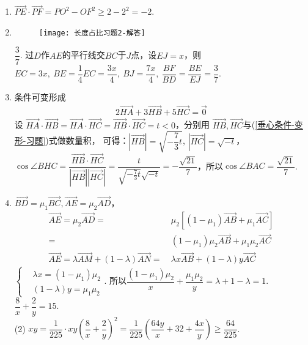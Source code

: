 \begin{enumerate}[label={\textbf{\arabic*.}},leftmargin=
    \inteval{\myenumleftmargin}pt]
\item $ \vec{PE}\cdot \vec{PF}=PO^2-OF^2 \geq 2-2^2=-2 $. 

\item 
\begin{figure}[h]
    \centering
    \texttt{[image: 长度占比习题2-解答]}
\end{figure}
$ \dfrac{3}{7} $. 过$ D $作$ AE $的平行线交$ BC $于$ J $点，设$ EJ=x $，则$ EC=3x,\ BE=\dfrac{1}{4}EC=\dfrac{3x}{4},\ BJ=\dfrac{7x}{4},\ \dfrac{BF}{BD}=\dfrac{BE}{EJ}=\dfrac{3}{7} $. 

\item 条件可变形成
\begin{align}\label{垂心条件-变形-习题}
    2\vec{HA}+
    3\vec{HB} +5\vec{HC}=\vec{0}
\end{align}
设 $ \vec{HA}\cdot \vec{HB}=\vec{HA}
\cdot\vec{HC}=\vec{HB}\cdot \vec{HC}=t<0 $，分别用
$ \vec{HB},\vec{HC} $与(\ref{垂心条件-变形-习题})式做数量积，
可得：$ |\vec{HB}|=\sqrt{-\dfrac{7}{3}t} $, $ |\vec{HC}|=\sqrt{-t} $，
$ \cos\angle BHC=\dfrac{\vec{HB}\cdot \vec{HC}}
{|\vec{HB}||\vec{HC}|}=\dfrac{t}{\sqrt{-\frac{7}{3}t}\sqrt{-t}}
=-\dfrac{\sqrt{21}}{7} $，所以$ \cos \angle BAC=\dfrac{\sqrt{21}}{7} $.

\item 
$ \vec{BD}=\mu_1\vec{BC}, \vec{AE} =
\mu_2\vec{AD} $，
\begin{align*}
    \vec{AE} =\mu_2\vec{AD} =&\ \mu_2\left[
    (1-\mu_1)\vec{AB}+\mu_1\vec{AC}\right]\\
    =&\ (1-\mu_1)\mu_2\vec{AB}+\mu_1\mu_2\vec{AC} \\
    \vec{AE}=\lambda\vec{AM}+(1-\lambda)
    \vec{AN}=&\ \lambda x\vec{AB}+(1-\lambda)y
    \vec{AC}
\end{align*}
$ \left\{ 
\begin{aligned}
    &\lambda x = (1-\mu_1)\mu_2 \\
    &(1-\lambda)y = \mu_1\mu_2
\end{aligned} \right. $. 所以$ \dfrac{(1-\mu_1)\mu_2}{x}+\dfrac{\mu_1\mu_2}{y}
=\lambda+1-\lambda=1 $.  \quad $ \dfrac{8}{x}+\dfrac{2}{y}=15 $. \\
(2) $ xy=\dfrac{1}{225}\cdot xy \left(\dfrac{8}{x}+\dfrac{2}{y}\right)^2=
\dfrac{1}{225}\left(\dfrac{64y}{x}+32+\dfrac{4x}{y}\right)\geq\dfrac{64}{225} $. 

\end{enumerate}
\myfootnote{\CopyrightStatementChap}
\cleardoublepage




